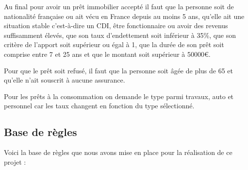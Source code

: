 \documentclass[
]{article}
\begin{document}
Au final pour avoir un prêt immobilier accepté il faut que la personne
soit de nationalité française ou ait vécu en France depuis au moins 5
ans, qu'elle ait une situation stable c'est-à-dire un CDI, être
fonctionnaire ou avoir des revenus suffisamment élevés, que son taux
d'endettement soit inférieur à 35\%, que son critère de l'apport soit
supérieur ou égal à 1, que la durée de son prêt soit comprise entre 7 et
25 ans et que le montant soit supérieur à 50000€.

Pour que le prêt soit refusé, il faut que la personne soit âgée de plus
de 65 et qu'elle n'ait souscrit à aucune assurance.

Pour les prêts à la consommation on demande le type parmi travaux, auto
et personnel car les taux changent en fonction du type sélectionné.

\pagebreak
\hypertarget{base-de-ruxe8gles}{%
\subsection{Base de règles}\label{base-de-ruxe8gles}}

Voici la base de règles que nous avons mise en place pour la réalisation de ce projet :
\end{document}
